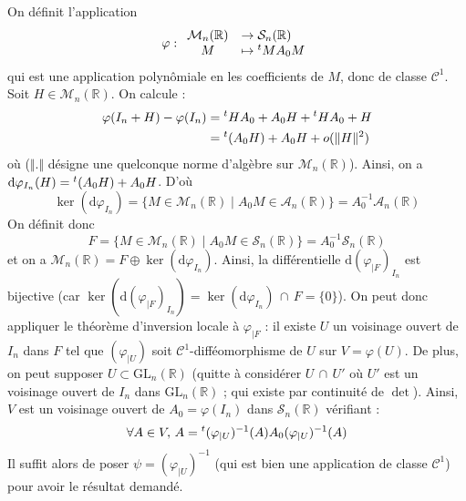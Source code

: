 	\begin{demonstration}
		On définit l'application
		\[ \varphi :
		\begin{array}{cl}
			\mathcal{M}_n(\mathbb{R}) &\rightarrow \mathcal{S}_n(\mathbb{R}) \\
			M &\mapsto \mathstrut ^t M A_0 M
		\end{array}
		\]
		qui est une application polynômiale en les coefficients de $M$, donc de classe $\mathcal{C}^1$. Soit $H \in \mathcal{M}_n(\mathbb{R})$. On calcule :
		\begin{align*}
			\varphi(I_n + H) - \varphi(I_n) &= \mathstrut ^t H A_0 + A_0 H + \mathstrut ^t H A_0 + H \\
			&= \mathstrut ^t (A_0 H) + A_0 H + o(\Vert H \Vert^2)
		\end{align*}
		où ($\Vert . \Vert$ désigne une quelconque norme d'algèbre sur $\mathcal{M}_n(\mathbb{R})$). Ainsi, on a $\mathrm{d} \varphi_{I_n}(H) = \mathstrut ^t (A_0 H) + A_0 H$. D'où
		\[ \ker(\mathrm{d} \varphi_{I_n}) = \{ M \in \mathcal{M}_n(\mathbb{R}) \mid A_0 M \in \mathcal{A}_n(\mathbb{R}) \} = A_0^{-1} \mathcal{A}_n(\mathbb{R}) \]
		On définit donc
		\[ F = \{ M \in \mathcal{M}_n(\mathbb{R}) \mid A_0 M \in \mathcal{S}_n(\mathbb{R}) \} = A_0^{-1} \mathcal{S}_n(\mathbb{R})  \]
		et on a $\mathcal{M}_n(\mathbb{R}) = F \oplus \ker(\mathrm{d} \varphi_{I_n})$. Ainsi, la différentielle $\mathrm{d} (\varphi_{|F})_{I_n}$ est bijective (car $\ker(\mathrm{d} (\varphi_{|F})_{I_n}) = \ker(\mathrm{d} \varphi_{I_n}) \, \cap \, F = \{ 0 \}$).
		\newpar
		On peut donc appliquer le théorème d'inversion locale à $\varphi_{|F}$ : il existe $U$ un voisinage ouvert de $I_n$ dans $F$ tel que $(\varphi_{|U})$ soit $\mathcal{C}^1$-difféomorphisme de $U$ sur $V = \varphi(U)$. De plus, on peut supposer $U \subset \mathrm{GL}_n(\mathbb{R})$ (quitte à considérer $U \, \cap \, U'$ où $U'$ est un voisinage ouvert de $I_n$ dans $\mathrm{GL}_n(\mathbb{R})$ ; qui existe par continuité de $\det$).
		\newpar
		Ainsi, $V$ est un voisinage ouvert de $A_0 = \varphi(I_n)$ dans $\mathcal{S}_n(\mathbb{R})$ vérifiant :
		\[ \forall A \in V, \, A = \mathstrut ^t (\varphi_{|U})^{-1}(A) A_0 (\varphi_{|U})^{-1}(A) \]
		Il suffit alors de poser $\psi = (\varphi_{|U})^{-1}$ (qui est bien une application de classe $\mathcal{C}^1$) pour avoir le résultat demandé.
	\end{demonstration}


